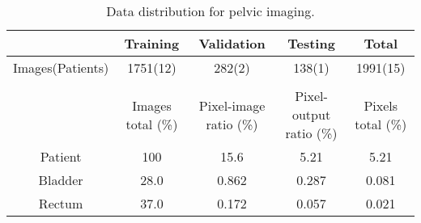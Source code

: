 \begin{table}[H]
\footnotesize
\caption{Data distribution for pelvic imaging.}
\centering
\begin{tabular}{c c c c c}
\hline\hline
& Training & Validation & Testing & Total  \\ [0.5ex]
\hline

Images(Patients) & 1751(12) & 282(2) & 138(1) & 1991(15) \\
 \\
 \hline\hline
		 & Images total (\%) & Pixel-image ratio (\%)& Pixel-output ratio (\%) & Pixels total (\%)\\ [0.5ex]
\hline
Patient  & 100 & 15.6  &  5.21 & 5.21\\
Bladder  & 28.0 & 0.862 & 0.287 & 0.081\\
Rectum   & 37.0 & 0.172 & 0.057 & 0.021\\
\hline\hline
\end{tabular}
\label{table:data_prostate}
\end{table}
